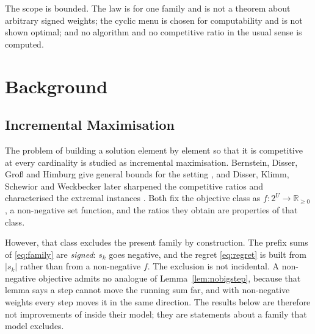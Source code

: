 The scope is bounded. The law is for one family and is not a theorem about arbitrary signed
weights; the cyclic menu is chosen for computability and is not shown optimal; and no
algorithm and no competitive ratio in the usual sense is computed.

\section{Background}

\subsection{Incremental Maximisation}

The problem of building a solution element by element so that it is competitive at every
cardinality is studied as incremental maximisation. Bernstein, Disser, Gro\ss{} and Himburg
give general bounds for the setting \cite{bernstein2017}, and Disser, Klimm, Schewior and
Weckbecker later sharpened the competitive ratios and characterised the extremal instances
\cite{disser2023}. Both fix the objective class as $f:2^{U}\to\mathbb{R}_{\ge0}$, a
non-negative set function, and the ratios they obtain are properties of that class.

However, that class excludes the present family by construction. The prefix sums of
\eqref{eq:family} are \emph{signed}: $s_{k}$ goes negative, and the regret \eqref{eq:regret}
is built from $|s_{k}|$ rather than from a non-negative $f$. The exclusion is not incidental.
A non-negative objective admits no analogue of Lemma~\ref{lem:nobigstep}, because that lemma
says a step cannot move the running sum far, and with non-negative weights every step moves
it in the same direction. The results below are therefore not improvements of
\cite{bernstein2017,disser2023} inside their model; they are statements about a family that
model excludes.

